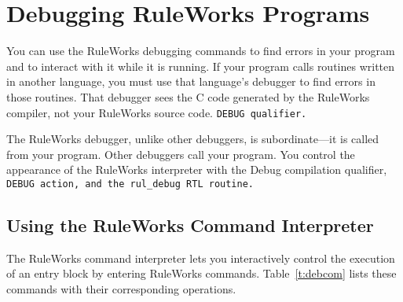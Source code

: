 \chapter{Debugging RuleWorks Programs}

You can use the RuleWorks debugging commands to find errors in your
program and to interact with it while it is running. If your program
calls routines written in another language, you must use that
language's debugger to find errors in those routines. That debugger
sees the C code generated by the RuleWorks compiler, not your
RuleWorks source code. \tt{DEBUG} qualifier.

\begin{note}
  The RuleWorks debugger, unlike other debuggers, is subordinate---it
  is called from your program. Other debuggers call your program. You
  control the appearance of the RuleWorks interpreter with the Debug
  compilation qualifier, \tt{DEBUG} action, and the \verb|rul_debug|
  RTL routine.
\end{note}

\section{Using the RuleWorks Command Interpreter}

The RuleWorks command interpreter lets you interactively control the
execution of an entry block by entering RuleWorks commands.
Table~\ref{t:debcom} lists these commands with their corresponding
operations.

